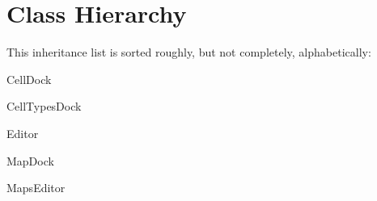 \section{Class Hierarchy}
This inheritance list is sorted roughly, but not completely, alphabetically\+:\begin{DoxyCompactList}
\item Cell\+Dock\begin{DoxyCompactList}
\item {}
\end{DoxyCompactList}
\item Cell\+Types\+Dock\begin{DoxyCompactList}
\item {}
\end{DoxyCompactList}
\item Editor\begin{DoxyCompactList}
\item {}
\end{DoxyCompactList}
\item {}
\begin{DoxyCompactList}
\item {}
\item {}
\item {}
\item {}
\item {}
\item {}
\item {}
\end{DoxyCompactList}
\item Map\+Dock\begin{DoxyCompactList}
\item {}
\end{DoxyCompactList}
\item Maps\+Editor\begin{DoxyCompactList}
\item {}

\end{DoxyCompactList}
\end{DoxyCompactList}
